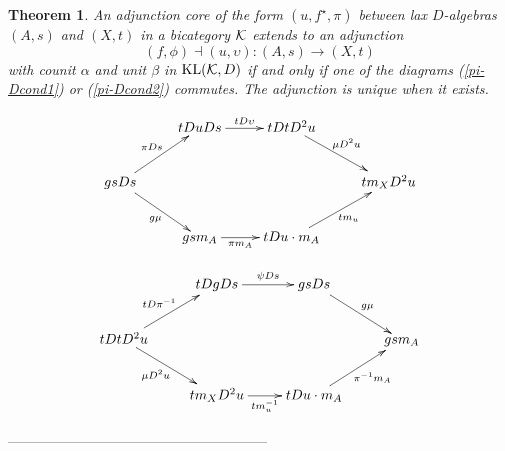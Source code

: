 \documentclass[a4paper,10pt]{article}
\newtheorem{theorem}{Theorem}
\newcommand{\bk}{{\cal{K}}}
\numberwithin{equation}{section}
\begin{document}
\begin{theorem} \label{KLDCoreThm}
An adjunction core of the form $(u,f^{\star},\pi)$ between lax $D$-algebras $(A,s)$ and $(X,t)$ in a bicategory $\bk$  extends to an adjunction 
\begin{equation}
(f,\phi) \dashv (u,\upsilon) : (A,s) \longrightarrow (X,t)
\end{equation}
with counit $\alpha$ and unit $\beta$ in $\mathrm{KL}(\bk,D)$ if and only if one of the diagrams (\ref{pi-Dcond1}) or (\ref{pi-Dcond2}) commutes. The adjunction is unique when it exists.
\end{theorem}  

\begin{equation}\label{pi-Dcond1}
\xymatrix{
& tDuDs \ar[r]^-{tD\upsilon} & tDtD^2 u \ar[rd]^-{\mu D^2 u} & \\
gsDs \ar[ru]^-{\pi Ds} \ar[rd]_-{g\mu} & & & tm_XD^2 u \\
& gsm_A \ar[r]_-{\pi m_A} & tDu \cdot m_A \ar[ru]_-{t m_u} &}
\end{equation}

\begin{equation}\label{pi-Dcond2}
\xymatrix{
& tDgDs \ar[r]^-{\psi Ds} & gsDs \ar[rd]^-{g \mu} & \\
tDtD^2u \ar[ru]^-{tD\pi^{-1}} \ar[rd]_-{\mu D^2u} & & & gsm_A \\
& tm_XD^2u \ar[r]_-{tm_{u}^{-1}} & tDu \cdot m_A \ar[ru]_-{\pi^{-1}m_A} &}
\end{equation}

\begin{center}
--------------------------------------------------------
\end{center}
\end{document}
